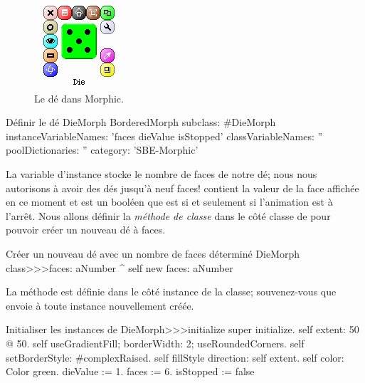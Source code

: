 \documentclass[a4paper,10pt,twoside]{book}
\begin{document}
\begin{figure}[ht]
	\centerline{\includegraphics[scale=0.65]{die}}
	\caption{Le dé dans Morphic.\label{fig:dialogDie}}
\end{figure}


\begin{classdef}{Définir le dé DieMorph}
BorderedMorph subclass: #DieMorph
	instanceVariableNames: 'faces dieValue isStopped'
	classVariableNames: ''
	poolDictionaries: ''
	category: 'SBE-Morphic'
\end{classdef}

La variable d'instance  stocke le nombre de faces de notre
dé; nous nous autorisons \`a avoir des dés jusqu'\`a neuf faces!
 contient la valeur de la face affichée en ce moment et
 est un booléen que est  si et seulement si
l'animation est \`a l'arrêt.
Nous allons définir la \emph{méthode de classe}  dans
le côté classe de  pour pouvoir créer un
nouveau dé \`a  faces.

\begin{method}{Créer un nouveau dé avec un nombre de faces déterminé}
DieMorph class>>>faces: aNumber
	^ self new faces: aNumber
\end{method}

La méthode  est définie dans le côté instance
de la classe; souvenez-vous que  envoie  \`a
toute instance nouvellement créée.

\begin{method}{Initialiser les instances de }
DieMorph>>>initialize
	super initialize.
	self extent: 50 @ 50.
	self useGradientFill; borderWidth: 2; useRoundedCorners.
	self setBorderStyle: #complexRaised.
	self fillStyle direction: self extent.
	self color: Color green.
	dieValue := 1.
	faces := 6.
	isStopped := false
\end{method}
\end{document}
